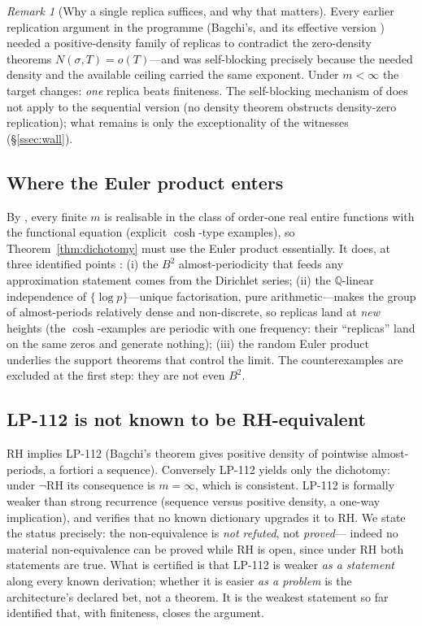 \documentclass[11pt]{amsart}
\theoremstyle{definition}
\theoremstyle{remark}
\newtheorem{remark}[theorem]{Remark}
\newcommand{\RH}{\mathrm{RH}}
\newcommand{\bbQ}{\mathbb{Q}}
\begin{document}
\begin{remark}[Why a single replica suffices, and why that matters]
Every earlier replication argument in the programme (Bagchi's, and its
effective version \cite[]{P40}) needed a positive-density family of
replicas to contradict the zero-density theorems
$N(\sigma,T)=o(T)$---and was self-blocking precisely because the needed
density and the available ceiling carried the same exponent. Under
$m<\infty$ the target changes: \emph{one} replica beats finiteness. The
self-blocking mechanism of \cite[]{P40} does not apply to the
sequential version (no density theorem obstructs density-zero replication);
what remains is only the exceptionality of the witnesses
(\S\ref{ssec:wall}).
\end{remark}

\subsection{Where the Euler product enters}
By \cite[Prop.~2.2]{P40}, every finite $m$ is realisable in the
class of order-one real entire functions with the functional equation
(explicit $\cosh$-type examples), so Theorem~\ref{thm:dichotomy} must use
the Euler product essentially. It does, at three identified points
\cite[\S3]{P40}: (i) the $B^2$ almost-periodicity that feeds any
approximation statement comes from the Dirichlet series; (ii) the
$\bbQ$-linear independence of $\{\log p\}$---unique factorisation, pure
arithmetic---makes the group of almost-periods relatively dense and
non-discrete, so replicas land at \emph{new} heights (the $\cosh$-examples
are periodic with one frequency: their ``replicas'' land on the same
zeros and generate nothing); (iii) the random Euler product underlies the
support theorems that control the limit. The counterexamples are excluded
at the first step: they are not even $B^2$.

\subsection{LP-112 is not known to be RH-equivalent}\label{ssec:notequiv}
RH implies LP-112 (Bagchi's theorem gives positive density of pointwise
almost-periods, a fortiori a sequence). Conversely LP-112 yields only the
dichotomy: under $\neg\RH$ its consequence is $m=\infty$, which is
consistent. LP-112 is formally weaker than strong recurrence (sequence
versus positive density, a one-way implication), and \cite[]{P40}
verifies that no known dictionary upgrades it to RH. We state the status
precisely: the non-equivalence is \emph{not refuted}, not \emph{proved}---
indeed no material non-equivalence can be proved while RH is open, since
under RH both statements are true. What is certified is that LP-112 is
weaker \emph{as a statement} along every known derivation; whether it is
easier \emph{as a problem} is the architecture's declared bet, not a
theorem. It is the weakest statement so far identified that, with
finiteness, closes the argument.
\end{document}
